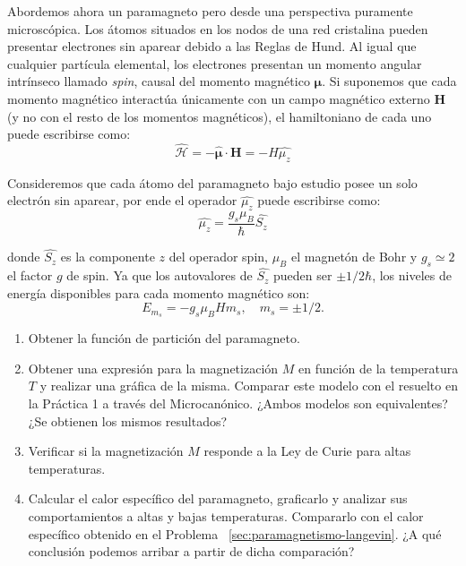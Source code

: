 \documentclass[a4paper,11pt]{article}
\begin{document}
Abordemos ahora un paramagneto pero desde una perspectiva puramente
microscópica. Los átomos situados en los nodos de una red cristalina pueden
presentar electrones sin aparear debido a las Reglas de Hund. Al igual que
cualquier partícula elemental, los electrones presentan un momento angular
intrínseco llamado \emph{spin}, causal del momento magnético
$\boldsymbol{\mu}$.
Si suponemos que cada momento magnético interactúa únicamente con un
campo magnético externo $\textbf{H}$ (y no con el resto de los momentos
magnéticos), el hamiltoniano de cada uno puede escribirse como:
$$ \hat{\mathcal{H}} =
- \hat{\boldsymbol{\mu}} \cdot \textbf{H} = - H \hat{\mu_z} $$

Consideremos que cada átomo del paramagneto bajo estudio posee un solo
electrón sin aparear, por ende el operador $\hat{\mu_z}$ puede
escribirse como:
$$ \hat{\mu_z} = \frac{g_s \mu_B}{\hbar} \hat{S_z} $$

donde $\hat{S_z}$ es la componente $z$ del operador spin, $\mu_B$ el
magnetón de Bohr y $g_s \simeq 2$ el factor $g$ de spin. Ya que los
autovalores de $\hat{S_z}$ pueden ser $\pm 1/2 \hbar$, los niveles de
energía disponibles para cada momento magnético son:
$$ E_{m_s} = - g_s \mu_B H m_s, \quad  m_s = \pm 1/2.$$

\begin{enumerate}[label=(\alph*),
                  leftmargin=2\parindent,
                  rightmargin=2\parindent]

    \item{Obtener la función de partición del paramagneto.}

    \item{Obtener una expresión para la magnetización $M$ en función
          de la temperatura $T$ y realizar una gráfica de la misma.
          Comparar este modelo con el resuelto en la Práctica 1 a
          través del Microcanónico.
          ¿Ambos modelos son equivalentes?
          ¿Se obtienen los mismos resultados?}

    \item{Verificar si la magnetización $M$ responde a la Ley de Curie
          para altas temperaturas.}

    \item{Calcular el calor específico del paramagneto, graficarlo y
          analizar sus comportamientos a altas y bajas temperaturas.
          Compararlo con el calor específico obtenido en el
          Problema~ \ref{sec:paramagnetismo-langevin}.
          ¿A qué conclusión podemos arribar a partir de dicha comparación?
          }

\end{enumerate}
\end{document}

